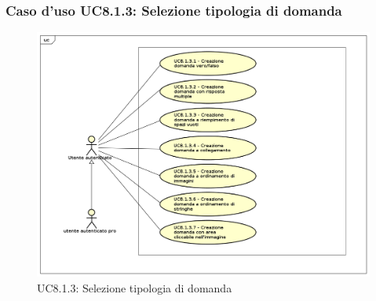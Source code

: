 	\subsubsection{Caso d'uso UC8.1.3: Selezione tipologia di domanda}
	\label{UC8.1.3}
	\begin{figure}[h]
		\centering
			\includegraphics[scale=0.45,keepaspectratio]{UML/UC8_1_3.png}
		\caption{UC8.1.3: Selezione tipologia di domanda}
	\end{figure}
	\FloatBarrier
